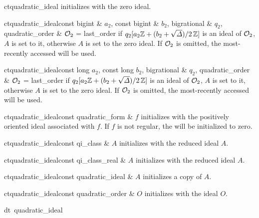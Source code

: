 \CONS

\begin{fcode}{ct}{quadratic_ideal}{}
  initializes with the zero ideal.
\end{fcode}

\begin{fcode}{ct}{quadratic_ideal}{const bigint & $a_2$, const bigint &
    $b_2$, bigrational & $q_2$, quadratic_order & $\mathcal{O}_2$ = last_order}%
  if $q_2 [a_2\mathbb{Z} + (b_2 + \sqrt{\varDelta})/2\, \mathbb{Z} ]$ is an ideal of $\mathcal{O}_2$, $A$ is set to it,
  otherwise $A$ is set to the zero ideal.  If $\mathcal{O}_2$ is omitted, the most-recently accessed
   will be used.
\end{fcode}

\begin{fcode}{ct}{quadratic_ideal}{const long $a_2$, const long $b_2$, bigrational & $q_2$,
    quadratic_order & $\mathcal{O}_2$ = last_order}%
  if $q_2 [a_2\mathbb{Z} + (b_2 + \sqrt{\varDelta})/2\, \mathbb{Z} ]$ is an ideal of $\mathcal{O}_2$, $A$ is set to it,
  otherwise $A$ is set to the zero ideal.  If $\mathcal{O}_2$ is omitted, the most-recently accessed
   will be used.
\end{fcode}

\begin{fcode}{ct}{quadratic_ideal}{const quadratic_form & $f$}
  initializes with the positively oriented ideal associated with $f$.  If $f$ is not regular,
  the  will be initialized to zero.
\end{fcode}

\begin{fcode}{ct}{quadratic_ideal}{const qi_class & $A$}
  initializes with the reduced ideal $A$.
\end{fcode}

\begin{fcode}{ct}{quadratic_ideal}{const qi_class_real & $A$}
  initializes with the reduced ideal $A$.
\end{fcode}

\begin{fcode}{ct}{quadratic_ideal}{const quadratic_ideal & $A$}
  initializes a copy of $A$.
\end{fcode}

\begin{fcode}{ct}{quadratic_ideal}{const quadratic_order & $O$}
  initializes with the ideal $O$.
\end{fcode}

\begin{fcode}{dt}{~quadratic_ideal}{}
\end{fcode}


